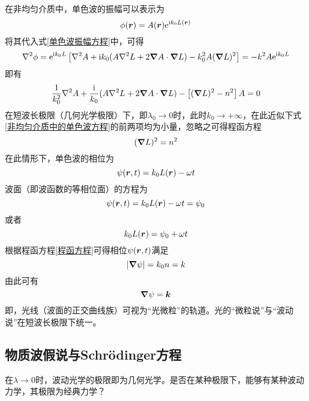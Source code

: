在非均匀介质中，单色波的振幅可以表示为
\begin{equation*}
	\phi(\boldsymbol{r}) = A(\boldsymbol{r}) \mathrm{e}^{\mathrm{i}k_0 L(\boldsymbol{r})}
\end{equation*}
将其代入式\eqref{单色波振幅方程}中，可得
\begin{equation*}
	\nabla^2 \phi = \mathrm{e}^{\mathrm{i}k_0 L} \left[\nabla^2 A + \mathrm{i} k_0(A\nabla^2 L + 2\boldsymbol{\nabla} A \cdot \boldsymbol{\nabla} L) - k_0^2 A(\boldsymbol{\nabla} L)^2 \right] = -k^2 A \mathrm{e}^{\mathrm{i} k_0 L}
\end{equation*}
即有
\begin{equation}
	\frac{1}{k_0^2} \nabla^2 A + \frac{\mathrm{i}}{k_0} (A\nabla^2 L + 2\boldsymbol{\nabla} A \cdot \boldsymbol{\nabla} L) - \left[(\boldsymbol{\nabla} L)^2 - n^2\right] A = 0
	\label{非均匀介质中的单色波方程}
\end{equation}
在短波长极限（几何光学极限）下，即$\lambda_0 \to 0$时，此时$k_0 \to +\infty$，在此近似下式\eqref{非均匀介质中的单色波方程}的前两项均为小量，忽略之可得{\heiti 程函方程}
\begin{equation}
	(\boldsymbol{\nabla} L)^2 = n^2
	\label{程函方程}
\end{equation}
在此情形下，单色波的相位为
\begin{equation*}
	\psi(\boldsymbol{r},t) = k_0 L(\boldsymbol{r}) - \omega t
\end{equation*}
波面（即波函数的等相位面）的方程为
\begin{equation*}
	\psi(\boldsymbol{r},t) = k_0 L(\boldsymbol{r}) - \omega t = \psi_0
\end{equation*}
或者
\begin{equation*}
	k_0 L(\boldsymbol{r}) = \psi_0 + \omega t
\end{equation*}
根据程函方程\eqref{程函方程}可得相位$\psi(\boldsymbol{r},t)$满足
\begin{equation*}
	|\boldsymbol{\nabla} \psi| = k_0 n = k
\end{equation*}
由此可有
\begin{equation*}
	\boldsymbol{\nabla} \psi = \boldsymbol{k}
\end{equation*}
即，光线（波面的正交曲线族）可视为“光微粒”的轨道。光的“微粒说”与“波动说”在短波长极限下统一。

\subsection{物质波假说与Schr\"{o}dinger方程}

在$\lambda \to 0$时，波动光学的极限即为几何光学。是否在某种极限下，能够有某种波动力学，其极限为经典力学？

